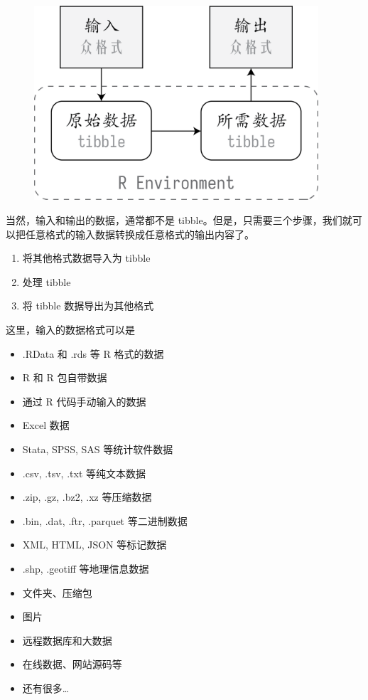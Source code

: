 \documentclass[
  letterpaper,
]{ctexbook}
\providecommand{\tightlist}{%
  \setlength{\itemsep}{0pt}\setlength{\parskip}{0pt}}\usepackage{longtable,booktabs,array}
\begin{document}
\begin{figure}

{\centering \includegraphics[width=4.16667in,height=\textheight]{fig/intro_diagram.png}

}

\end{figure}

当然，输入和输出的数据，通常都不是
tibble。但是，只需要三个步骤，我们就可以把任意格式的输入数据转换成任意格式的输出内容了。

\begin{enumerate}
\def\labelenumi{\arabic{enumi}.}
\tightlist
\item
  将其他格式数据导入为 tibble
\item
  处理 tibble
\item
  将 tibble 数据导出为其他格式
\end{enumerate}

这里，输入的数据格式可以是

\begin{itemize}
\tightlist
\item
  .RData 和 .rds 等 R 格式的数据
\item
  R 和 R 包自带数据
\item
  通过 R 代码手动输入的数据
\item
  Excel 数据
\item
  Stata, SPSS, SAS 等统计软件数据
\item
  .csv, .tsv, .txt 等纯文本数据
\item
  .zip, .gz, .bz2, .xz 等压缩数据
\item
  .bin, .dat, .ftr, .parquet 等二进制数据
\item
  XML, HTML, JSON 等标记数据
\item
  .shp, .geotiff 等地理信息数据
\item
  文件夹、压缩包
\item
  图片
\item
  远程数据库和大数据
\item
  在线数据、网站源码等
\item
  还有很多\ldots{}
\end{itemize}
\end{document}
